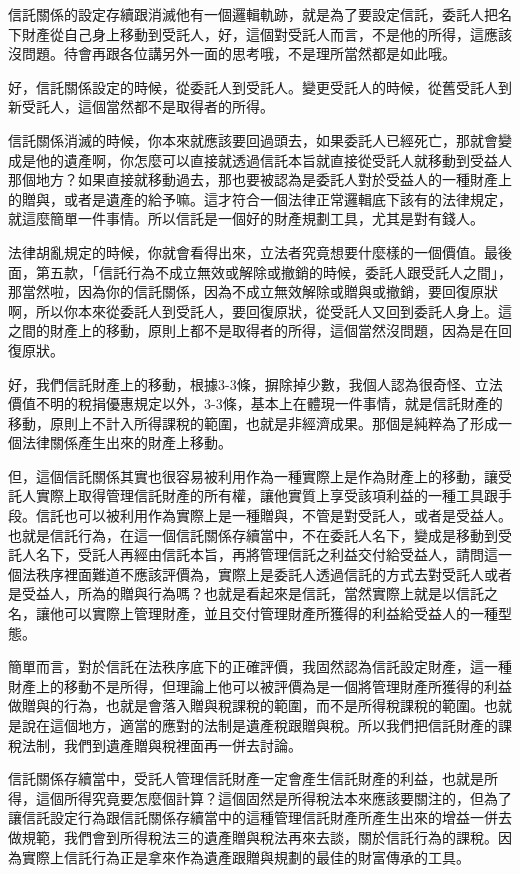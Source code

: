 \documentclass[]{ctexbook}
\begin{document}
信託關係的設定存續跟消滅他有一個邏輯軌跡，就是為了要設定信託，委託人把名下財產從自己身上移動到受託人，好，這個對受託人而言，不是他的所得，這應該沒問題。待會再跟各位講另外一面的思考哦，不是理所當然都是如此哦。

好，信託關係設定的時候，從委託人到受託人。變更受託人的時候，從舊受託人到新受託人，這個當然都不是取得者的所得。

信託關係消滅的時候，你本來就應該要回過頭去，如果委託人已經死亡，那就會變成是他的遺產啊，你怎麼可以直接就透過信託本旨就直接從受託人就移動到受益人那個地方？如果直接就移動過去，那也要被認為是委託人對於受益人的一種財產上的贈與，或者是遺產的給予嘛。這才符合一個法律正常邏輯底下該有的法律規定，就這麼簡單一件事情。所以信託是一個好的財產規劃工具，尤其是對有錢人。

法律胡亂規定的時候，你就會看得出來，立法者究竟想要什麼樣的一個價值。最後面，第五款，「信託行為不成立無效或解除或撤銷的時候，委託人跟受託人之間」，那當然啦，因為你的信託關係，因為不成立無效解除或贈與或撤銷，要回復原狀啊，所以你本來從委託人到受託人，要回復原狀，從受託人又回到委託人身上。這之間的財產上的移動，原則上都不是取得者的所得，這個當然沒問題，因為是在回復原狀。

好，我們信託財產上的移動，根據3-3條，摒除掉少數，我個人認為很奇怪、立法價值不明的稅捐優惠規定以外，3-3條，基本上在體現一件事情，就是信託財產的移動，原則上不計入所得課稅的範圍，也就是非經濟成果。那個是純粹為了形成一個法律關係產生出來的財產上移動。

但，這個信託關係其實也很容易被利用作為一種實際上是作為財產上的移動，讓受託人實際上取得管理信託財產的所有權，讓他實質上享受該項利益的一種工具跟手段。信託也可以被利用作為實際上是一種贈與，不管是對受託人，或者是受益人。也就是信託行為，在這一個信託關係存續當中，不在委託人名下，變成是移動到受託人名下，受託人再經由信託本旨，再將管理信託之利益交付給受益人，請問這一個法秩序裡面難道不應該評價為，實際上是委託人透過信託的方式去對受託人或者是受益人，所為的贈與行為嗎？也就是看起來是信託，當然實際上就是以信託之名，讓他可以實際上管理財產，並且交付管理財產所獲得的利益給受益人的一種型態。

簡單而言，對於信託在法秩序底下的正確評價，我固然認為信託設定財產，這一種財產上的移動不是所得，但理論上他可以被評價為是一個將管理財產所獲得的利益做贈與的行為，也就是會落入贈與稅課稅的範圍，而不是所得稅課稅的範圍。也就是說在這個地方，適當的應對的法制是遺產稅跟贈與稅。所以我們把信託財產的課稅法制，我們到遺產贈與稅裡面再一併去討論。

信託關係存續當中，受託人管理信託財產一定會產生信託財產的利益，也就是所得，這個所得究竟要怎麼個計算？這個固然是所得稅法本來應該要關注的，但為了讓信託設定行為跟信託關係存續當中的這種管理信託財產所產生出來的增益一併去做規範，我們會到所得稅法三的遺產贈與稅法再來去談，關於信託行為的課稅。因為實際上信託行為正是拿來作為遺產跟贈與規劃的最佳的財富傳承的工具。
\end{document}
